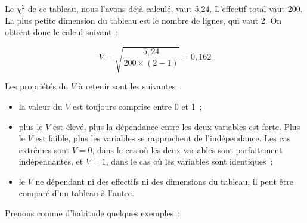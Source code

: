 \documentclass[a4paper,10pt,twoside,francais]{report}
\newcommand{\chid}{$\chi^2$\xspace}
\begin{document}
Le \chid de ce tableau, nous l'avons déjà calculé, vaut
5,24. L'effectif total vaut 200. La plus petite dimension du tableau
est le nombre de lignes, qui vaut 2. On obtient donc le calcul
suivant~:

$$ V = \sqrt{\frac{5,24}{200 \times (2-1)}} = 0,162 $$

Les propriétés du $V$ à retenir sont les suivantes~:

\begin{itemize}
\item la valeur du $V$ est toujours comprise entre 0 et 1~;
\item plus le $V$ est élevé, plus la dépendance entre les deux
  variables est forte. Plus le $V$ est faible, plus les variables se
  rapprochent de l'indépendance. Les cas extrêmes sont $V=0$, dans le
  cas où les deux variables sont parfaitement indépendantes, et $V=1$,
  dans le cas où les variables sont identiques~;
\item le $V$ ne dépendant ni des effectifs ni des dimensions du
  tableau, il peut être comparé d'un tableau à l'autre.
\end{itemize}

Prenons comme d'habitude quelques exemples~:
\end{document}
